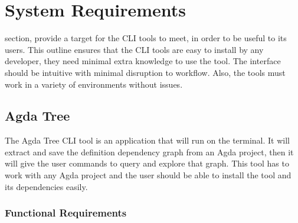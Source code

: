 
\chapter{System Requirements} \label{ch:system requirements}

section, provide a target for the CLI tools to meet, in order to be useful to
its users. This outline ensures that the CLI tools are easy to install by any
developer, they need minimal extra knowledge to use the tool. The interface
should be intuitive with minimal disruption to workflow. Also, the tools must
work in a variety of environments without issues.

\section{Agda Tree}

The Agda Tree CLI tool is an application that will run on the terminal. It will
extract and save the definition dependency graph from an Agda project, then it
will give the user commands to query and explore that graph. This tool has to
work with any Agda project and the user should be able to install the tool and
its dependencies easily.

\subsection{Functional Requirements}

